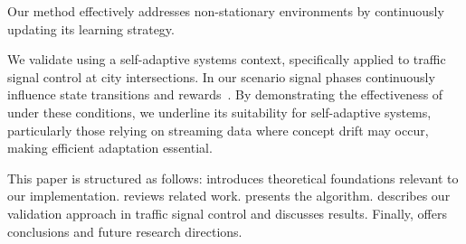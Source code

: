 Our method effectively addresses non-stationary environments by continuously updating its learning strategy. 

We validate \adaptiverl using a self-adaptive systems context, specifically applied to traffic signal 
control at city intersections. In our scenario signal phases continuously influence state transitions 
and rewards~\cite{meta-rl-traffic}. By demonstrating the effectiveness of \adaptiverl under these conditions, we underline its suitability for self-adaptive systems, particularly those relying on streaming data where concept drift may occur, making efficient adaptation essential.

This paper is structured as follows:  introduces theoretical foundations relevant to our implementation.  reviews related work.  presents the \adaptiverl algorithm.  describes our validation approach in traffic signal control and discusses results. Finally,  offers conclusions and future research directions.





\endinput

